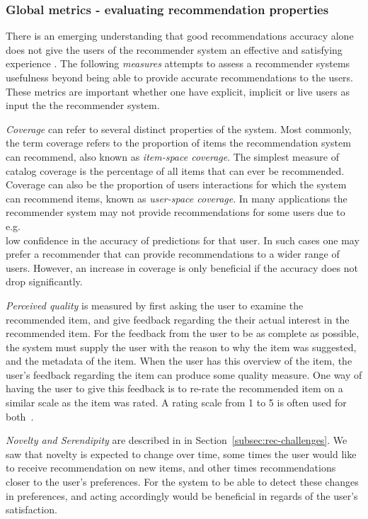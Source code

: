 \subsubsection{Global metrics - evaluating recommendation properties}

There is an emerging understanding that good recommendations accuracy alone
does not give the users of the recommender system an effective and satisfying
experience \cite{Herlocker2004}. The following \emph{measures} attempts to
assess a recommender systems usefulness beyond being able to provide accurate
recommendations to the users. These metrics are important whether one have
explicit, implicit or live users as input the the recommender system.

\textit{Coverage} can refer to several distinct properties of the system. Most
commonly, the term coverage refers to the proportion of items the
recommendation system can recommend, also known as \emph{item-space coverage}.
The simplest measure of catalog coverage is the percentage of all items that
can ever be recommended. Coverage can also be the proportion of users
interactions for which the system can recommend items, known as
\emph{user-space coverage}. In many applications the recommender system may not
provide recommendations for some users due to e.g.\\ low confidence in the
accuracy of predictions for that user. In such cases one may prefer a
recommender that can provide recommendations to a wider range of users.
However, an increase in coverage is only beneficial if the accuracy does not
drop significantly.

\textit{Perceived quality} is measured by first asking the user to examine the
recommended item, and give feedback regarding the their actual interest in the
recommended item.  For the feedback from the user to be as complete as
possible, the system must supply the user with the reason to why the item was
suggested, and the metadata of the item.  When the user has this overview of
the item, the user's feedback regarding the item can produce some quality
measure.  One  way of having the user to give this feedback is to re-rate the
recommended item on a similar scale as the item was rated.  A rating scale from
1 to 5 is often used for both~\cite{Schafer:1999:RSE:336992.337035}.

\textit{Novelty and Serendipity} are described in in
Section~\ref{subsec:rec-challenges}. We saw that novelty is expected to change
over time, some times the user would like to receive recommendation on new
items, and other times recommendations closer to the user's preferences.  For
the system to be able to detect these changes in preferences, and acting
accordingly would be beneficial in regards of the user's satisfaction.

